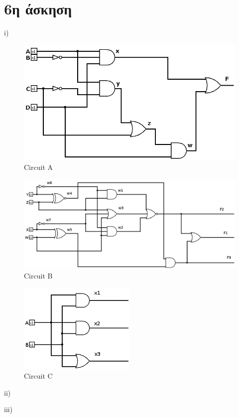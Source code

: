 \documentclass[a4paper]{article}
\begin{document}
\section*{6η άσκηση}
i)
	\begin{figure}[H]
		\centering
		\includegraphics[width=\textwidth]{../files/ex6ia.png}
		\caption{Circuit A}
	\end{figure}
	\begin{figure}[H]
		\centering
		\includegraphics[width=1.1\textwidth]{../files/ex6ib.png}
		\caption{Circuit B}
	\end{figure}
	\begin{figure}[H]
		\centering
		\includegraphics[width=0.5\textwidth]{../files/ex6ic.png}
		\caption{Circuit C}
	\end{figure}
ii)

iii)

\end{document}
